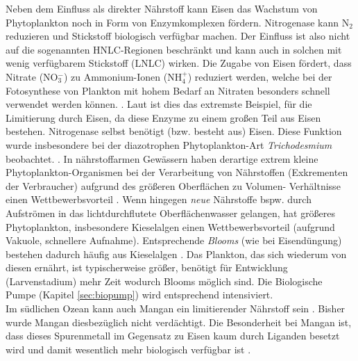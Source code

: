 \documentclass[12pt,a4paper,onecolumn]{scrartcl}
\begin{document}
Neben dem Einfluss als direkter Nährstoff kann Eisen das Wachstum von Phytoplankton noch in Form von Enzymkomplexen fördern. Nitrogenase kann N$_2$ reduzieren und Stickstoff biologisch verfügbar machen. Der Einfluss ist also nicht auf die sogenannten HNLC-Regionen beschränkt und kann auch in solchen mit wenig verfügbarem Stickstoff (LNLC) wirken. Die Zugabe von Eisen fördert, dass Nitrate (NO$_3^-$) zu Ammonium-Ionen (NH$_4^+$) reduziert werden, welche bei der Fotosynthese von Plankton mit hohem Bedarf an Nitraten besonders schnell verwendet werden können.  \citep{Emerson.2009}. Laut \citet{Emerson.2009} ist dies das extremste Beispiel, für die Limitierung durch Eisen, da diese Enzyme zu einem großen Teil aus Eisen bestehen. Nitrogenase selbst benötigt (bzw. besteht aus) Eisen. Diese Funktion wurde insbesondere bei der diazotrophen Phytoplankton-Art \textit{Trichodesmium} beobachtet. \citep{Falkowski.1998}.  In nährstoffarmen Gewässern haben derartige extrem kleine Phytoplankton-Organismen bei der Verarbeitung von Nährstoffen (Exkrementen der Verbraucher)  aufgrund des größeren Oberflächen zu Volumen- Verhältnisse einen Wettbewerbsvorteil \citep{Falkowski.1998}. Wenn hingegen \textit{neue} Nährstoffe bspw. durch Aufströmen in das lichtdurchflutete Oberflächenwasser gelangen, hat größeres Phytoplankton, insbesondere Kieselalgen einen Wettbewerbsvorteil (aufgrund Vakuole, schnellere Aufnahme). Entsprechende \textit{Blooms} (wie bei Eisendüngung) bestehen dadurch häufig aus Kieselalgen \citep{Boyd.2007}. Das Plankton, das sich wiederum von diesen ernährt, ist typischerweise größer, benötigt für Entwicklung (Larvenstadium) mehr Zeit wodurch Blooms möglich sind. Die Biologische Pumpe (Kapitel \ref{sec:biopump}) wird entsprechend intensiviert. \\

Im südlichen Ozean kann auch Mangan ein limitierender Nährstoff sein \citep{Browning.2021}. Bisher wurde Mangan diesbezüglich nicht verdächtigt. Die Besonderheit bei Mangan ist, dass dieses Spurenmetall im Gegensatz zu Eisen kaum durch Liganden besetzt wird und damit wesentlich mehr biologisch verfügbar ist \citep{Emerson.2009}. 
\end{document}
